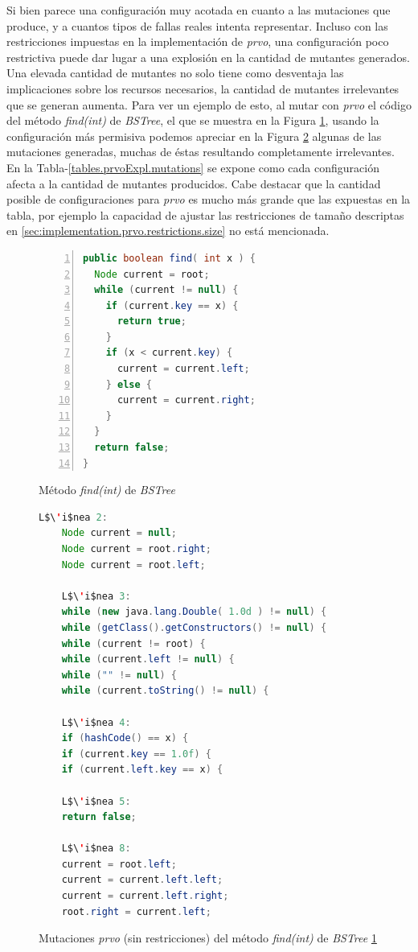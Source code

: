 Si bien parece una configuraci\'on muy acotada en cuanto a las mutaciones que produce, y a cuantos tipos de fallas reales intenta representar. Incluso con las restricciones impuestas en la implementaci\'on de \emph{prvo}, una configuraci\'on poco restrictiva puede dar lugar a una explosi\'on en la cantidad de mutantes generados. Una elevada cantidad de mutantes no solo tiene como desventaja las implicaciones sobre los recursos necesarios, la cantidad de mutantes irrelevantes que se generan aumenta. Para ver un ejemplo de esto, al mutar con \emph{prvo} el c\'odigo del m\'etodo \emph{find(int)} de \emph{BSTree}, el que se muestra en la Figura \ref{figures.examples.prvoExpl.findMethod}, usando la configuraci\'on m\'as permisiva podemos apreciar en la Figura \ref{figures.examples.prvoExpl.mutations} algunas de las mutaciones generadas, muchas de \'estas resultando completamente irrelevantes. En la Tabla-\ref{tables.prvoExpl.mutations} se expone como cada configuraci\'on afecta a la cantidad de mutantes producidos. Cabe destacar que la cantidad posible de configuraciones para \emph{prvo} es mucho m\'as grande que las expuestas en la tabla, por ejemplo la capacidad de ajustar las restricciones de tama\~no descriptas en \ref{sec:implementation.prvo.restrictions.size} no est\'a mencionada.

\begin{figure}
	\begin{lstlisting}[frame=single, numbers=left, mathescape=true,language=Java]
public boolean find( int x ) {
  Node current = root;
  while (current != null) {
    if (current.key == x) {
      return true;
    }
    if (x < current.key) {
      current = current.left;
    } else {
      current = current.right;
    }
  }
  return false;
}
	\end{lstlisting}
	\caption{M\'etodo \emph{find(int)} de \emph{BSTree}}
	\label{figures.examples.prvoExpl.findMethod}
\end{figure}

\begin{figure}
	\begin{lstlisting}[mathescape=true,language=Java]
	L$\'i$nea 2:
	Node current = null;
	Node current = root.right;
	Node current = root.left;
	
	L$\'i$nea 3:
	while (new java.lang.Double( 1.0d ) != null) {
	while (getClass().getConstructors() != null) {
	while (current != root) {
	while (current.left != null) {
	while ("" != null) {
	while (current.toString() != null) {
	
	L$\'i$nea 4:
	if (hashCode() == x) {
	if (current.key == 1.0f) {
	if (current.left.key == x) {
	
	L$\'i$nea 5:
	return false;
	
	L$\'i$nea 8:
	current = root.left;
	current = current.left.left;
	current = current.left.right;
	root.right = current.left;
	\end{lstlisting}
	\caption{Mutaciones \emph{prvo} (sin restricciones) del m\'etodo \emph{find(int)} de \emph{BSTree} \ref{figures.examples.prvoExpl.findMethod}}
	\label{figures.examples.prvoExpl.mutations}
\end{figure}

